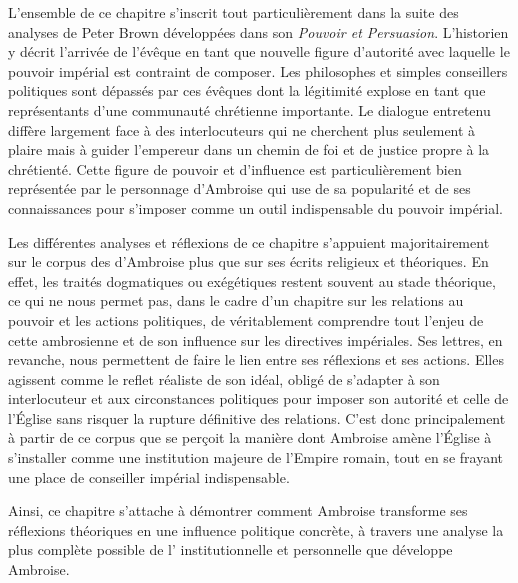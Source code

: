 \bigskip

L'ensemble de ce chapitre s'inscrit tout particulièrement dans la suite des analyses de Peter Brown développées dans son \textit{Pouvoir et Persuasion}\autocite{brown_power_1992}. L'historien y décrit l'arrivée de l'évêque en tant que nouvelle figure d'autorité avec laquelle le pouvoir impérial est contraint de composer. Les philosophes et simples conseillers politiques sont dépassés par ces évêques dont la légitimité explose en tant que représentants d'une communauté chrétienne importante. Le dialogue entretenu diffère largement face à des interlocuteurs qui ne cherchent plus seulement à plaire mais à guider l'empereur dans un chemin de foi et de justice propre à la chrétienté. Cette figure de pouvoir et d'influence est particulièrement bien représentée par le personnage d'Ambroise qui use de sa popularité et de ses connaissances pour s'imposer comme un outil indispensable du pouvoir impérial.

\bigskip

Les différentes analyses et réflexions de ce chapitre s'appuient majoritairement sur le corpus des  d'Ambroise plus que sur ses écrits religieux et théoriques. En effet, les traités dogmatiques ou exégétiques restent souvent au stade théorique, ce qui ne nous permet pas, dans le cadre d'un chapitre sur les relations au pouvoir et les actions politiques, de véritablement comprendre tout l'enjeu de cette  ambrosienne et de son influence sur les directives impériales. Ses lettres, en revanche, nous permettent de faire le lien entre ses réflexions et ses actions. Elles agissent comme le reflet réaliste de son idéal, obligé de s'adapter à son interlocuteur et aux circonstances politiques pour imposer son autorité et celle de l'Église sans risquer la rupture définitive des relations. C'est donc principalement à partir de ce corpus que se perçoit la manière dont Ambroise amène l'Église à s'installer comme une institution majeure de l'Empire romain, tout en se frayant une place de conseiller impérial indispensable.

\bigskip

Ainsi, ce chapitre s'attache à démontrer comment Ambroise transforme ses réflexions théoriques en une influence politique concrète, à travers une analyse la plus complète possible de l' institutionnelle et personnelle que développe Ambroise.
